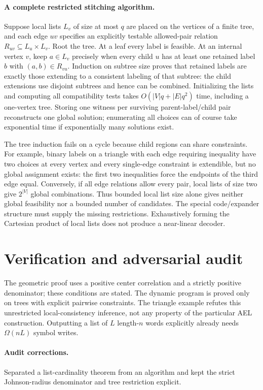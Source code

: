 \documentclass[11pt]{article}
\begin{document}
\paragraph{A complete restricted stitching algorithm.}
Suppose local lists $L_v$ of size at most $q$ are placed on the vertices of a finite tree, and each edge $uv$ specifies an explicitly testable allowed-pair relation $R_{uv}\subseteq L_u\times L_v$. Root the tree. At a leaf every label is feasible. At an internal vertex $v$, keep $a\in L_v$ precisely when every child $u$ has at least one retained label $b$ with $(a,b)\in R_{vu}$. Induction on subtree size proves that retained labels are exactly those extending to a consistent labeling of that subtree: the child extensions use disjoint subtrees and hence can be combined. Initializing the lists and computing all compatibility tests takes $O(|V|q+|E|q^2)$ time, including a one-vertex tree. Storing one witness per surviving parent-label/child pair reconstructs one global solution; enumerating all choices can of course take exponential time if exponentially many solutions exist.

The tree induction fails on a cycle because child regions can share constraints. For example, binary labels on a triangle with each edge requiring inequality have two choices at every vertex and every single-edge constraint is extendible, but no global assignment exists: the first two inequalities force the endpoints of the third edge equal. Conversely, if all edge relations allow every pair, local lists of size two give $2^{|V|}$ global combinations. Thus bounded local list size alone gives neither global feasibility nor a bounded number of candidates. The special code/expander structure must supply the missing restrictions. Exhaustively forming the Cartesian product of local lists does not produce a near-linear decoder.
\section{Verification and adversarial audit}
The geometric proof uses a positive center correlation and a strictly positive denominator; these conditions are stated. The dynamic program is proved only on trees with explicit pairwise constraints. The triangle example refutes this unrestricted local-consistency inference, not any property of the particular AEL construction. Outputting a list of $L$ length-$n$ words explicitly already needs $\Omega(nL)$ symbol writes.
\paragraph{Audit corrections.} Separated a list-cardinality theorem from an algorithm and kept the strict Johnson-radius denominator and tree restriction explicit.
\end{document}
